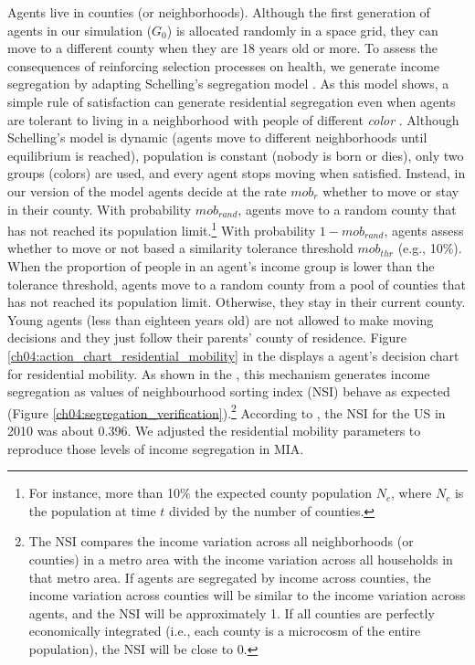 \documentclass[class=article, crop=false, 12pt]{standalone}
\begin{document}
Agents live in counties (or neighborhoods). Although the first generation of agents in our simulation ($G_0$) is allocated randomly in a space grid, they can move to a different county when they are 18 years old or more. To assess the consequences of reinforcing selection processes on health, we generate income segregation by adapting Schelling's segregation model \citep{schelling2006}. As this model shows, a simple rule of satisfaction can generate residential segregation even when agents are tolerant to living in a neighborhood with people of different \textit{color} \citep{wilensky2015}. Although Schelling's model is dynamic (agents move to different neighborhoods until equilibrium is reached), population is constant (nobody is born or dies), only two groups (colors) are used, and every agent stops moving when satisfied. Instead, in our version of the model agents decide at the rate $mob_r$ whether to move or stay in their county. With probability $mob_{rand}$, agents move to a random county that has not reached its population limit.\footnote{For instance, more than 10\% the expected county population $N_c$, where $N_c$ is the population at time $t$ divided by the number of counties.} With probability $1 - mob_{rand}$, agents assess whether to move or not based a similarity tolerance threshold $mob_{thr}$ (e.g., 10\%). When the proportion of people in an agent's income group is lower than the tolerance threshold, agents move to a random county from a pool of counties that has not reached its population limit. Otherwise, they stay in their current county. Young agents (less than eighteen years old) are not allowed to make moving decisions and they just follow their parents' county of residence. Figure \ref{ch04:action_chart_residential_mobility} in the \textit{} displays a agent's decision chart for residential mobility. As shown in the \textit{}, this mechanism generates income segregation as values of neighbourhood sorting index (NSI) behave as expected (Figure \ref{ch04:segregation_verification}).\footnote{ The NSI compares the income variation across all neighborhoods (or counties) in a metro area with the income variation across all households in that metro area. If agents are segregated by income across counties, the income variation across counties will be similar to the income variation across agents, and the NSI will be approximately 1. If all counties are perfectly economically integrated (i.e., each county is a microcosm of the entire population), the NSI will be close to 0.} According to \citet{jargowsky2017}, the NSI for the US in 2010 was about 0.396. We adjusted the residential mobility parameters to reproduce those levels of income segregation in MIA.
\end{document}
